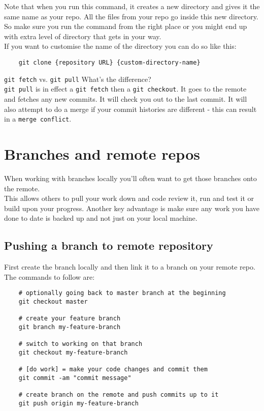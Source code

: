 Note that when you run this command, it creates a new directory and gives it the same name as your repo. All the files from your repo go inside this new directory. So make sure you run the command from the right place or you might end up with extra level of directory that gets in your way.
\\

If you want to customise the name of the directory you can do so like this:
\\

\begin{verbatim}
    git clone {repository URL} {custom-directory-name}
\end{verbatim}


\begin{infobox}{ \texttt{git fetch} vs. \texttt{git pull}}
    What's the difference?
	\\

    \texttt{git pull} is in effect a \texttt{git fetch} then a \texttt{git checkout}. It goes to the remote and fetches any new commits. It will check you out to the last commit. It will also attempt to do a merge if your commit histories are different - this can result in a \texttt{merge conflict}.
\end{infobox}


\section{Branches and remote repos}

When working with branches locally you'll often want to get those branches onto the remote.
\\

This allows others to pull your work down and code review it, run and test it or build upon your progress. Another key advantage is make sure any work you have done to date is backed up and not just on your local machine.
\\

\subsection{Pushing a branch to remote repository}

First create the branch locally and then link it to a branch on your remote repo.
\\

The commands to follow are:

\begin{verbatim}
    # optionally going back to master branch at the beginning
    git checkout master

    # create your feature branch
    git branch my-feature-branch 

    # switch to working on that branch
    git checkout my-feature-branch 

    # [do work] = make your code changes and commit them
    git commit -am "commit message" 

    # create branch on the remote and push commits up to it
    git push origin my-feature-branch
\end{verbatim}

